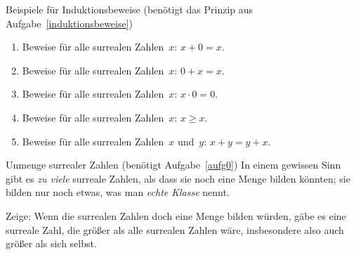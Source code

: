 \documentclass{../zirkelblatt}
\begin{document}
\begin{aufgabe}{Beispiele für Induktionsbeweise (benötigt
das Prinzip aus Aufgabe~\ref{induktionsbeweise})}
\label{induktionsbeispiele}
\begin{enumerate}
\item Beweise für alle surrealen Zahlen~$x$: $x + 0 = x$.
\item Beweise für alle surrealen Zahlen~$x$: $0 + x = x$.
\item Beweise für alle surrealen Zahlen~$x$: $x \cdot 0 = 0$.
\item Beweise für alle surrealen Zahlen~$x$: $x \geq x$.
\item Beweise für alle surrealen Zahlen~$x$ und~$y$: $x + y = y + x$.
\end{enumerate}
\end{aufgabe}

\begin{aufgabe}{Unmenge surrealer Zahlen (benötigt Aufgabe~\ref{aufg0})}
\label{unmenge}
In einem gewissen Sinn gibt es \emph{zu viele} surreale Zahlen, als dass sie
noch eine Menge bilden könnten; sie bilden nur noch etwas, was man \emph{echte
Klasse} nennt.

Zeige: Wenn die surrealen Zahlen doch eine Menge bilden würden, gäbe es eine
surreale Zahl, die größer als alle surrealen Zahlen wäre, insbesondere also auch
größer als sich selbst.
\end{aufgabe}
\end{document}
